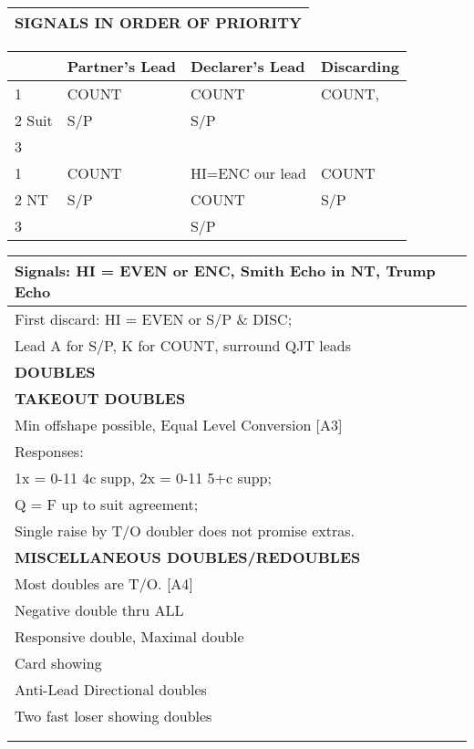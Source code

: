 \documentclass{article}
\begin{document}
\begin{minipage}{90mm}
\begin{tabular}{| p{88mm} |}
		\cellcolor{orange!25}\textbf{SIGNALS IN ORDER OF PRIORITY} \\ \hline
	\end{tabular}
	\begin{tabular}{| p{8.9mm} | p{22mm} | p{22mm} | p{22mm} |}
		& Partner's Lead & Declarer's Lead & Discarding \\ \hline
		1 & COUNT & COUNT & COUNT, \\ \hline
		2 Suit & S/P & S/P& \\ \hline
		3 & & & \\ \hline
		1 & COUNT & HI=ENC our lead & COUNT \\ \hline
		2 NT & S/P & COUNT & S/P \\ \hline
		3 & & S/P & \\ \hline
	\end{tabular}
	\begin{tabular}{| p{88mm} |}
		Signals: HI = EVEN or ENC, Smith Echo in NT, Trump Echo\\ \hline
		First discard: HI = EVEN or S/P \& DISC;\\ \hline
		Lead A for S/P, K for COUNT, surround QJT leads\\ \hline \hline
		\cellcolor{green!25} \textbf{DOUBLES} \\ \hline
		\cellcolor{orange!25}\textbf{TAKEOUT DOUBLES} \\ \hline
		Min offshape possible, Equal Level Conversion [A3]\\ \hline
		Responses:\\ \hline
		1x = 0-11 4c supp, 2x = 0-11 5+c supp;\\ \hline
		Q = F up to suit agreement;\\ \hline
		Single raise by T/O doubler does not promise extras.\\ \hline
		\cellcolor{orange!25}\textbf{MISCELLANEOUS DOUBLES/REDOUBLES} \\ \hline
		Most doubles are T/O. [A4]\\ \hline
		Negative double thru ALL\\ \hline
		Responsive double, Maximal double\\ \hline
		Card showing\\ \hline
		Anti-Lead Directional doubles\\ \hline
		Two fast loser showing doubles\\ \hline
		\\ \hline
		\\ \hline
	\end{tabular}
\end{minipage}
\end{document}
